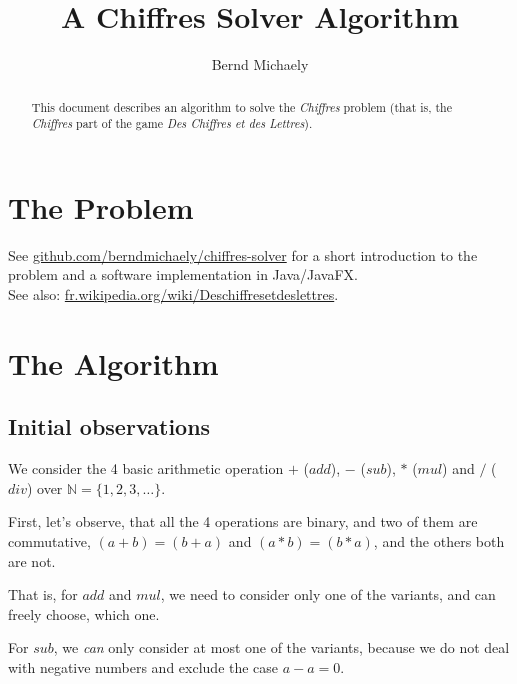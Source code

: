 \documentclass[english]{article}
\title{A Chiffres Solver Algorithm}
\author{Bernd Michaely}
\begin{document}
	
\large


\maketitle

\begin{abstract}

This document describes an algorithm to solve the \emph{Chiffres} problem (that is, the \emph{Chiffres} part of the game \emph{Des Chiffres et des Lettres}).

\end{abstract}

\newpage


\section{The Problem}

See \href{https://github.com/berndmichaely/chiffres-solver}{github.com/berndmichaely/chiffres-solver} for a short introduction to the problem and a software implementation in Java/JavaFX.
\\
See also: \href{https://fr.wikipedia.org/wiki/Des_chiffres_et_des_lettres}{fr.wikipedia.org/wiki/Des\textunderscore chiffres\textunderscore et\textunderscore des\textunderscore lettres}.

\section{The Algorithm}

\subsection{Initial observations}

We consider the 4 basic arithmetic operation $+$ ($add$), $-$ ($sub$), $*$ ($mul$) and $/$ ($div$) over $\mathbb{N}=\lbrace1, 2, 3, \ldots\rbrace$.

First, let's observe, that all the 4 operations are binary, and two of them are commutative, $(a+b)=(b+a)$ and $(a*b)=(b*a)$, and the others both are not.

That is, for $add$ and $mul$, we need to consider only one of the variants, and can freely choose, which one.

For $sub$, we \emph{can} only consider at most one of the variants, because we do not deal with negative numbers and exclude the case $a-a=0$.
\end{document}
